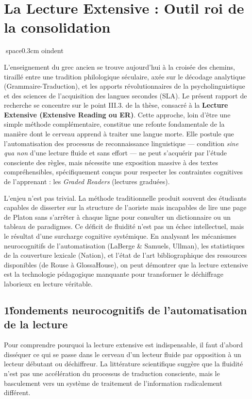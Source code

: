 

\section{La Lecture Extensive : Outil roi de la consolidation}
space{0.3cm}
oindent

L'enseignement du grec ancien se trouve aujourd'hui à la croisée des chemins, tiraillé entre une
tradition philologique séculaire, axée sur le décodage analytique (Grammaire-Traduction), et les
apports révolutionnaires de la psycholinguistique et des sciences de l'acquisition des langues
secondes (SLA). Le présent rapport de recherche se concentre sur le point III.3.\cite{III-3-2-ref2}
de la thèse, consacré à la \textbf{Lecture Extensive (Extensive Reading ou ER)}. Cette approche,
loin d'être une simple méthode complémentaire, constitue une refonte fondamentale de la manière dont
le cerveau apprend à traiter une langue morte. Elle postule que l'automatisation des processus de
reconnaissance linguistique — condition \textit{sine qua non} d'une lecture fluide et sans effort —
ne peut s'acquérir par l'étude consciente des règles, mais nécessite une exposition massive à des
textes compréhensibles, spécifiquement conçus pour respecter les contraintes cognitives de
l'apprenant : les \textit{Graded Readers} (lectures graduées).

L'enjeu n'est pas trivial. La méthode traditionnelle produit souvent des étudiants capables de
disserter sur la structure de l'aoriste mais incapables de lire une page de Platon sans s'arrêter à
chaque ligne pour consulter un dictionnaire ou un tableau de paradigmes. Ce déficit de fluidité
n'est pas un échec intellectuel, mais le résultat d'une surcharge cognitive systémique. En analysant
les mécanismes neurocognitifs de l'automatisation (LaBerge \& Samuels, Ullman), les statistiques de
la couverture lexicale (Nation), et l'état de l'art bibliographique des ressources disponibles (de
Rouse à GlossaHouse), on peut démontrer que la lecture extensive est la technologie pédagogique
manquante pour transformer le déchiffrage laborieux en lecture véritable.



\subsection{1\. fondements neurocognitifs de l'automatisation de la lecture}

Pour comprendre pourquoi la lecture extensive est indispensable, il faut d'abord disséquer ce qui se
passe dans le cerveau d'un lecteur fluide par opposition à un lecteur débutant ou \og
déchiffreur\fg{}. La littérature scientifique suggère que la fluidité n'est pas une accélération du
processus de traduction consciente, mais le basculement vers un système de traitement de
l'information radicalement différent.



